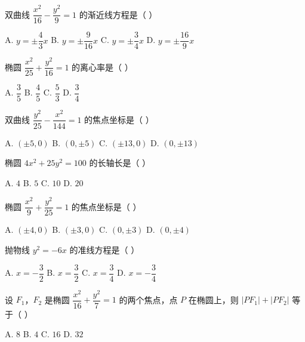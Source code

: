 \documentclass[11pt, a4paper]{article}
\begin{document}
\begin{baitap}[18]
双曲线 $\dfrac{x^2}{16}-\dfrac{y^2}{9}=1$ 的渐近线方程是（ ）
\par\vspace{3pt}
\noindent A. $y=\pm\dfrac{4}{3}x$ \quad B. $y=\pm\dfrac{9}{16}x$ \quad C. $y=\pm\dfrac{3}{4}x$ \quad D. $y=\pm\dfrac{16}{9}x$
\end{baitap}

\begin{baitap}[19]
椭圆 $\dfrac{x^2}{25}+\dfrac{y^2}{16}=1$ 的离心率是（ ）
\par\vspace{3pt}
\noindent A. $\dfrac{3}{5}$ \quad B. $\dfrac{4}{5}$ \quad C. $\dfrac{5}{3}$ \quad D. $\dfrac{3}{4}$
\end{baitap}

\begin{baitap}[20]
双曲线 $\dfrac{y^2}{25}-\dfrac{x^2}{144}=1$ 的焦点坐标是（ ）
\par\vspace{3pt}
\noindent A. $(\pm 5,0)$ \quad B. $(0,\pm 5)$ \quad C. $(\pm 13,0)$ \quad D. $(0,\pm 13)$
\end{baitap}

\begin{baitap}[21]
椭圆 $4x^2+25y^2=100$ 的长轴长是（ ）
\par\vspace{3pt}
\noindent A. $4$ \quad B. $5$ \quad C. $10$ \quad D. $20$
\end{baitap}

\begin{baitap}[22]
椭圆 $\dfrac{x^2}{9}+\dfrac{y^2}{25}=1$ 的焦点坐标是（ ）
\par\vspace{3pt}
\noindent A. $(\pm 4,0)$ \quad B. $(\pm 3,0)$ \quad C. $(0,\pm 3)$ \quad D. $(0,\pm 4)$
\end{baitap}

\begin{baitap}[23]
抛物线 $y^2=-6x$ 的准线方程是（ ）
\par\vspace{3pt}
\noindent A. $x=-\dfrac{3}{2}$ \quad B. $x=\dfrac{3}{2}$ \quad C. $x=\dfrac{3}{4}$ \quad D. $x=-\dfrac{3}{4}$
\end{baitap}

\begin{baitap}[24]
设 $F_1$，$F_2$ 是椭圆 $\dfrac{x^2}{16}+\dfrac{y^2}{7}=1$ 的两个焦点，点 $P$ 在椭圆上，则 $\lvert PF_1\rvert+\lvert PF_2\rvert$ 等于（ ）
\par\vspace{3pt}
\noindent A. $8$ \quad B. $4$ \quad C. $16$ \quad D. $32$
\end{baitap}
\end{document}
